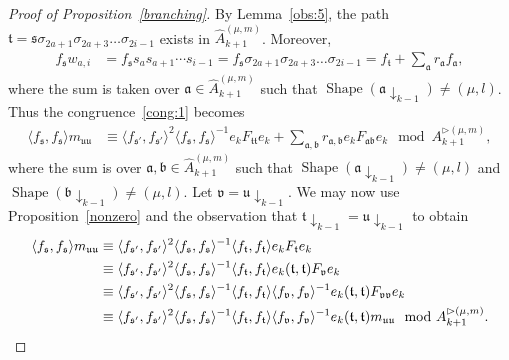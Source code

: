 \documentclass[11pt,a4paper,reqno,svgnames]{amsart}
\theoremstyle{plain}
\theoremstyle{definition}
\numberwithin{equation}{section}
\begin{document}
\begin{proof}[Proof of Proposition~\ref{branching}]
By Lemma~\ref{obs:5}, the path $\mathfrak{t}=\mathfrak{s}\sigma_{2a+1}\sigma_{2a+3}\ldots\sigma_{2i-1}$ exists in $\hat{A}_{k+1}^{(\mu,m)}$. Moreover, 
\begin{align*}
f_\mathfrak{s}w_{a,i}&=f_\mathfrak{s}s_{a}s_{a+1}\cdots s_{i-1}=f_\mathfrak{s}\sigma_{2a+1}\sigma_{2a+3}\ldots\sigma_{2i-1}= f_\mathfrak{t}+\sum_\mathfrak{a} r_\mathfrak{a}f_\mathfrak{a},
\end{align*}
where the sum is taken over $\mathfrak{a}\in\hat{A}_{k+1}^{(\mu,m)}$ such that  $\operatorname{Shape}(\mathfrak{a}\downarrow_{k-1})\ne (\mu,l)$. Thus the congruence~\eqref{cong:1} becomes
\begin{align*}
\langle f_\mathfrak{s},f_\mathfrak{s}\rangle m_\mathfrak{uu}
&\equiv\langle f_\mathfrak{s'},f_\mathfrak{s'}\rangle^2\langle f_\mathfrak{s},f_\mathfrak{s}\rangle^{-1} e_kF_\mathfrak{tt} e_k + \sum_\mathfrak{a,b} r_\mathfrak{a,b} e_k F_\mathfrak{ab}e_k \mod A_{k+1}^{\rhd(\mu,m)}, 
\end{align*}
where the sum is over $\mathfrak{a,b}\in\hat{A}_{k+1}^{(\mu,m)}$ such that $\operatorname{Shape}(\mathfrak{a}\downarrow_{k-1})\ne(\mu,l)$ and $\operatorname{Shape}(\mathfrak{b}\downarrow_{k-1})\ne(\mu,l)$. Let $\mathfrak{v}=\mathfrak{u}\downarrow_{k-1}$. We may now use Proposition~\ref{nonzero} and the observation that $\mathfrak{t}\downarrow_{k-1}=\mathfrak{u}\downarrow_{k-1}$ to obtain  
\begin{align}
\langle f_\mathfrak{s},f_\mathfrak{s}\rangle m_\mathfrak{uu}
&\equiv\langle f_\mathfrak{s'},f_\mathfrak{s'}\rangle^2\langle f_\mathfrak{s},f_\mathfrak{s}\rangle^{-1}\langle f_\mathfrak{t},f_\mathfrak{t}\rangle   e_kF_\mathfrak{t}e_k\notag \\
&\equiv\langle f_\mathfrak{s'},f_\mathfrak{s'}\rangle^2\langle f_\mathfrak{s},f_\mathfrak{s}\rangle^{-1}\langle f_\mathfrak{t},f_\mathfrak{t}\rangle e_k(\mathfrak{t,t})F_\mathfrak{v}e_k\notag \\
&\equiv \langle f_\mathfrak{s'},f_\mathfrak{s'}\rangle^2\langle f_\mathfrak{s},f_\mathfrak{s}\rangle^{-1}\langle f_\mathfrak{t},f_\mathfrak{t}\rangle \langle f_\mathfrak{v},f_\mathfrak{v}\rangle^{-1}e_k(\mathfrak{t,t})F_\mathfrak{vv}e_k \notag\\
&\equiv \langle f_\mathfrak{s'},f_\mathfrak{s'}\rangle^2\langle f_\mathfrak{s},f_\mathfrak{s}\rangle^{-1}\langle f_\mathfrak{t},f_\mathfrak{t}\rangle \langle f_\mathfrak{v},f_\mathfrak{v}\rangle^{-1} e_k(\mathfrak{t,t})m_\mathfrak{uu}\label{caseiii} \mod A_{k+1}^{\rhd(\mu,m)}.
\end{align}

\end{proof}
\end{document}
